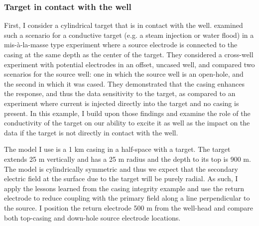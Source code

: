 \subsubsection{Target in contact with the well}
First, I consider a cylindrical target that is in contact with the well. \cite{Schenkel1994} examined such a scenario for a conductive target (e.g. a steam injection or water flood) in a mis-\`a-la-masse type experiment where a source electrode is connected to the casing at the same depth as the center of the target. They considered a cross-well experiment with potential electrodes in an offset, uncased well, and compared two scenarios for the source well: one in which the source well is an open-hole, and the second in which it was cased. They demonstrated that the casing enhances the response, and thus the data sensitivity to the target, as compared to an experiment where current is injected directly into the target and no casing is present. In this example, I build upon those findings and examine the role of the conductivity of the target on our ability to excite it as well as the impact on the data if the target is not directly in contact with the well.

The model I use is a 1 km casing in a half-space with a target. The target extends 25 m vertically and has a 25 m radius and the depth to its top is 900 m. The model is cylindrically symmetric and thus we expect that the secondary electric field at the surface due to the target will be purely radial. As such, I apply the lessons learned from the casing integrity example and use the return electrode to reduce coupling with the primary field along a line perpendicular to the source. I position the return electrode 500 m from the well-head and compare both top-casing and down-hole source electrode locations.

